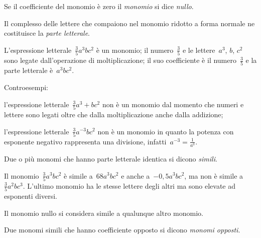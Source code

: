 \begin{definizione}
Se il coefficiente del monomio è zero il \emph{monomio} si dice \emph{nullo}.

Il complesso delle lettere che compaiono nel monomio ridotto a forma
normale ne costituisce la \emph{parte letterale}.
\end{definizione}

\begin{exrig}
 \begin{esempio}
L'espressione letterale~$\frac{3}{5}a^{3}bc^{2}$ è un monomio;
il numero~$\frac{3}{5}$ e le lettere~$a^{3}$, $b$, $c^{2}$ sono legate
dall'operazione di moltiplicazione; il suo coefficiente è il numero~$\frac{3}{5}$ e la parte letterale è~$a^{3}bc^{2}$.
 \end{esempio}

 \begin{esempio}
 Controesempi:

 \begin{enumeratea}
 \item l'espressione letterale~$\frac{3}{5}a^{3}+bc^{2}$
 non è un monomio dal momento che numeri e lettere sono legati oltre
che dalla moltiplicazione anche dalla addizione;
\item l'espressione letterale~$\frac{3}{5}a^{-3}bc^{2}$
non è un monomio in quanto la potenza con esponente negativo
rappresenta una divisione, infatti~$a^{-3}=\frac{1}{a^{3}}$.
\end{enumeratea}
 \end{esempio}
\end{exrig}

\begin{definizione}
 Due o più monomi che hanno parte letterale identica si dicono \emph{simili}.
\end{definizione}

\begin{exrig}
 \begin{esempio}
Il monomio~$\frac{3}{5}a^{3}bc^{2}$ è simile
a~$68a^{3}bc^{2}$ e anche a~$-0,5a^{3}bc^{2}$, ma non è simile
a~$\frac{3}{5}a^{2}bc^{3}$. L'ultimo monomio ha le
stesse lettere degli altri ma sono elevate ad esponenti diversi.
 \end{esempio}
\end{exrig}

\osservazione Il monomio nullo si considera simile a qualunque altro monomio.

\begin{definizione}
Due monomi simili che hanno coefficiente opposto si dicono \emph{monomi opposti}.
\end{definizione}


